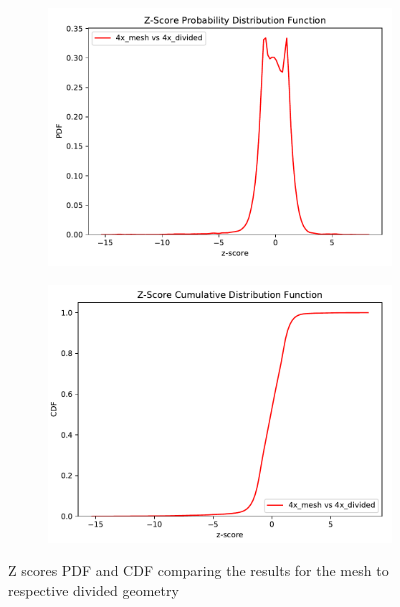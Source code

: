 \begin{figure}
	\begin{subfigure}[t]{0.5\textwidth}
		\includegraphics[width=\linewidth, trim={0cm 0cm 0cm 0.9cm},clip]{../figs/toy_p1/PDF_zscore_VPI_4xm_4xs.pdf}
		\label{fig:1dose_4x_split}
	\end{subfigure}\hfill
	\begin{subfigure}[t]{0.5\textwidth}
		\includegraphics[width=\linewidth, trim={0cm 0cm 0cm 0.8cm},clip]{../figs/toy_p1/CDF_zscore_VPI_4xm_4xs.pdf}
		\label{fig:1dose_4x_mesh}
	\end{subfigure}
	\caption{Z scores PDF and CDF comparing the results for the mesh to respective divided geometry }
	\label{fig:1zscore}
\end{figure}

